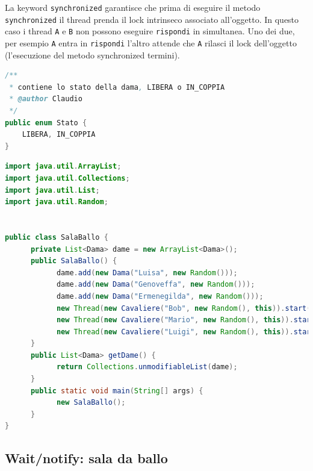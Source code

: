 \documentclass{article}
\begin{document}
La keyword \texttt{synchronized} garantisce che prima di eseguire il metodo \texttt{synchronized}  il thread prenda il lock intrinseco associato all'oggetto. In questo caso i thread \texttt{A} e \texttt{B} non possono eseguire \texttt{rispondi} in simultanea. Uno dei due, per esempio \texttt{A} entra in \texttt{rispondi} l'altro attende che \texttt{A} rilasci il lock dell'oggetto (l'esecuzione del metodo synchronized termini).

\begin{lstlisting}[language=Java]
/**
 * contiene lo stato della dama, LIBERA o IN_COPPIA
 * @author Claudio
 */
public enum Stato {
	LIBERA, IN_COPPIA
}
\end{lstlisting}
\begin{lstlisting}[language=Java]
import java.util.ArrayList;
import java.util.Collections;
import java.util.List;
import java.util.Random;


public class SalaBallo {
      private List<Dama> dame = new ArrayList<Dama>();
      public SalaBallo() {
            dame.add(new Dama("Luisa", new Random()));
            dame.add(new Dama("Genoveffa", new Random()));
            dame.add(new Dama("Ermenegilda", new Random()));
            new Thread(new Cavaliere("Bob", new Random(), this)).start();
            new Thread(new Cavaliere("Mario", new Random(), this)).start();
            new Thread(new Cavaliere("Luigi", new Random(), this)).start();
      }
      public List<Dama> getDame() {
            return Collections.unmodifiableList(dame);
      }
      public static void main(String[] args) {
            new SalaBallo();
      } 
}
\end{lstlisting}

\subsection{Wait/notify: sala da ballo}
\end{document}
